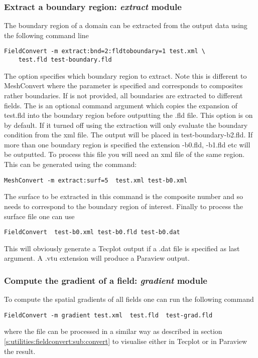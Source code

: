\subsubsection{Extract a boundary region: \textit{extract} module}
The boundary region of a domain can be extracted from the output 
data using the following command line
%
\begin{lstlisting}[style=BashInputStyle]
FieldConvert -m extract:bnd=2:fldtoboundary=1 test.xml \
	test.fld test-boundary.fld
\end{lstlisting}
%
The option  specifies which boundary region to extract. 
Note this is different to MeshConvert where the parameter  
is specified and corresponds to composites rather boundaries. If  
is not provided, all boundaries are extracted to different fields. The  
is an optional command argument which copies the expansion of test.fld into 
the boundary region before outputting the .fld file. This option is on by default. 
If it turned off using \inltt{fldtoboundary=0} the extraction will only evaluate the 
boundary condition from the xml file. The output will be placed in test-boundary-b2.fld. 
If more than one boundary region is specified the extension -b0.fld, -b1.fld etc will be 
outputted. To process this file you will need an xml file of the same region. 
This can be generated using the command:
%
\begin{lstlisting}[style=BashInputStyle]
MeshConvert -m extract:surf=5  test.xml test-b0.xml
\end{lstlisting}
%
The surface to be extracted in this command is the composite 
number and so needs to correspond to the boundary region 
of interest. Finally to process the surface file one can use
%
\begin{lstlisting}[style=BashInputStyle]
FieldConvert  test-b0.xml test-b0.fld test-b0.dat
\end{lstlisting}
%
This will obviously generate a Tecplot output if a .dat file 
is specified as last argument. A .vtu extension will produce 
a Paraview output.
%
%
%
\subsubsection{Compute the gradient of a field: \textit{gradient} module}
To compute the spatial gradients of all fields one can run the following command
%
\begin{lstlisting}[style=BashInputStyle]
FieldConvert -m gradient test.xml  test.fld  test-grad.fld
\end{lstlisting}
%
where the file  can be processed in a similar 
way as described in section \ref{s:utilities:fieldconvert:sub:convert}
to visualise either in Tecplot or in Paraview the result.
%
%
%
%
